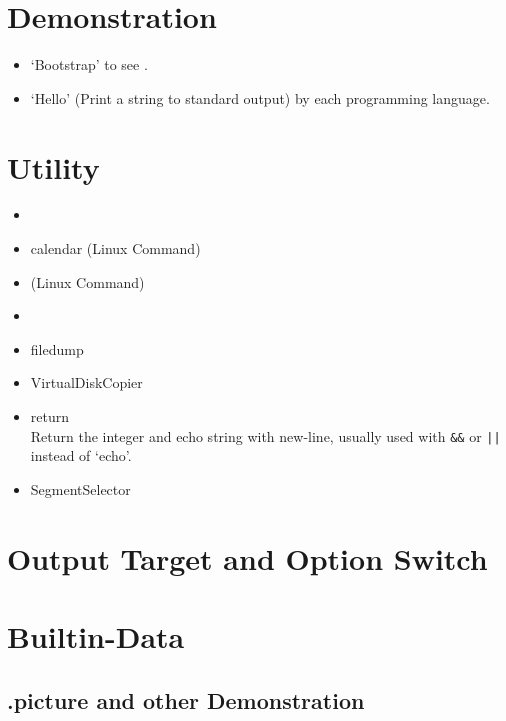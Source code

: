 \section{Demonstration}

\begin{itemize}
	\item `Bootstrap' to see .
	\item `Hello' (Print a string to standard output) by each programming language. 
\end{itemize}

\section{Utility}

\begin{itemize}
\item {}
\item {}    calendar (Linux Command)
\item {}  (Linux Command)
\item {}
\item {}  filedump
\item {}  VirtualDiskCopier
\item {}    return \\
	Return the integer and echo string with new-line, usually used with \verb`&&` or \verb `||` instead of `echo'.
\item {} SegmentSelector
\end{itemize}

\section{Output Target and Option Switch}


\section{Builtin-Data}

\subsection{.picture and other Demonstration}

